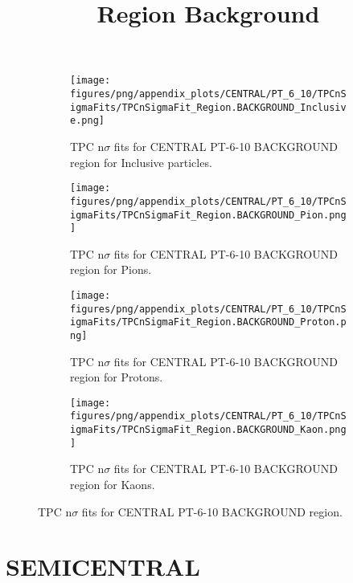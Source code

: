             \begin{figure}[H]
                \title{Region Background}
                \begin{subfigure}[b]{0.5\textwidth}
                    \centering
                    \texttt{[image: figures/png/appendix\_plots/CENTRAL/PT\_6\_10/TPCnSigmaFits/TPCnSigmaFit\_Region.BACKGROUND\_Inclusive.png]}
                    \caption{TPC n$\sigma$ fits for CENTRAL PT-6-10 BACKGROUND region for Inclusive particles.}
                    \label{fig:appendix_CENTRAL_PT-6-10_BACKGROUND_Inclusive}
                \end{subfigure}
                \begin{subfigure}[b]{0.5\textwidth}
                    \centering
                    \texttt{[image: figures/png/appendix\_plots/CENTRAL/PT\_6\_10/TPCnSigmaFits/TPCnSigmaFit\_Region.BACKGROUND\_Pion.png]}
                    \caption{TPC n$\sigma$ fits for CENTRAL PT-6-10 BACKGROUND region for Pions.}
                    \label{fig:appendix_CENTRAL_PT-6-10_BACKGROUND_Pion}
                \end{subfigure}
                \begin{subfigure}[b]{0.5\textwidth}
                    \centering
                    \texttt{[image: figures/png/appendix\_plots/CENTRAL/PT\_6\_10/TPCnSigmaFits/TPCnSigmaFit\_Region.BACKGROUND\_Proton.png]}
                    \caption{TPC n$\sigma$ fits for CENTRAL PT-6-10 BACKGROUND region for Protons.}
                    \label{fig:appendix_CENTRAL_PT-6-10_BACKGROUND_Proton}
                \end{subfigure}
                \begin{subfigure}[b]{0.5\textwidth}
                    \centering
                    \texttt{[image: figures/png/appendix\_plots/CENTRAL/PT\_6\_10/TPCnSigmaFits/TPCnSigmaFit\_Region.BACKGROUND\_Kaon.png]}
                    \caption{TPC n$\sigma$ fits for CENTRAL PT-6-10 BACKGROUND region for Kaons.}
                    \label{fig:appendix_CENTRAL_PT-6-10_BACKGROUND_Kaon}
                \end{subfigure}
                \caption{TPC n$\sigma$ fits for CENTRAL PT-6-10 BACKGROUND region.}
                \label{fig:appendix_CENTRAL_PT-6-10_BACKGROUND}
            \end{figure}
            \clearpage
            
    
        \section{SEMICENTRAL}
        
